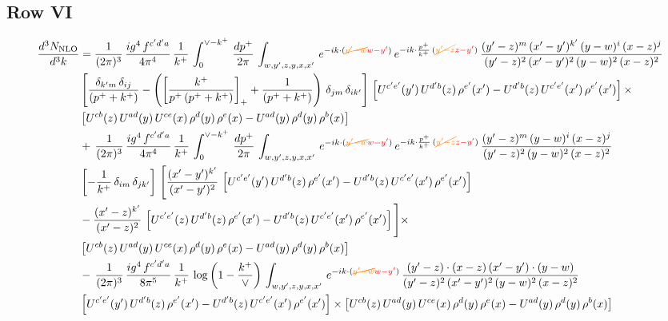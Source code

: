 \documentclass[9pt]{article}
\numberwithin{equation}{section}
\begin{document}
\subsection{Row VI}
\begin{align}
    \frac{d^{3}N_{\rm NLO}}{d^{3}k} & =  \frac{1}{(2\pi)^{3}}\, \frac{ig^{4}\,f^{c'd'a}}{4\pi^{4}}\, \frac{1}{k^{+}}\,\int_{0}^{\vee-k^{+}}\, \frac{dp^{+}}{2\pi}\, \int_{w,y',z,y,x,x'}\, e^{-ik\cdot ({\color{orange}\cancel{y'-w}}{\color{red}w-y'})}\, e^{-ik\cdot \frac{p^{+}}{k^{+}}\,({\color{orange}\cancel{y'-z}}{\color{red}z-y'})}\,\frac{(y'-z)^{m}\,(x'-y')^{k'}\,(y-w)^{i}\,(x-z)^{j}}{(y'-z)^{2}\,(x'-y')^{2}\,(y-w)^{2}\,(x-z)^{2}}\notag \\ & \left[\frac{\delta_{k'm}\,\delta_{ij}}{(p^{+}+k^{+})}-\left(\left[\frac{k^{+}}{p^{+}\,(p^{+}+k^{+})}\right]_{+}+\frac{1}{(p^{+}+k^{+})}\right)\,\delta_{jm}\,\delta_{ik'}\right]\, \left[U^{c'e'}(y')\,U^{d'b}(z)\,\rho^{e'}(x')-U^{d'b}(z)\,U^{c'e'}(x')\,\rho^{e'}(x')\right]\times\notag \\ &  \left[U^{cb}(z)\,U^{ad}(y)\,U^{ce}(x)\,\rho^{d}(y)\,\rho^{e}(x)-U^{ad}(y)\,\rho^{d}(y)\,\rho^{b}(x)\right] \notag \\ &  +\,\frac{1}{(2\pi)^{3}}\, \frac{ig^{4}\,f^{c'd'a}}{4\pi^{4}}\, \frac{1}{k^{+}}\,\int_{0}^{\vee-k^{+}}\, \frac{dp^{+}}{2\pi}\, \int_{w,y',z,y,x,x'}\, e^{-ik\cdot ({\color{orange}\cancel{y'-w}}{\color{red}w-y'})}\, e^{-ik\cdot \frac{p^{+}}{k^{+}}\,({\color{orange}\cancel{y'-z}}{\color{red}z-y'})}\,\frac{(y'-z)^{m}\,(y-w)^{i}\,(x-z)^{j}}{(y'-z)^{2}\,(y-w)^{2}\,(x-z)^{2}}\notag \\ &  \left[-\frac{1}{k^{+}}\, \delta_{im}\, \delta_{jk'}\right]\, \Bigg[\frac{(x'-y')^{k'}}{(x'-y')^{2}}\,\left[U^{c'e'}(y')\,U^{d'b}(z)\,\rho^{e'}(x')-U^{d'b}(z)\,U^{c'e'}(x')\,\rho^{e'}(x')\right]\notag \\ & -\frac{(x'-z)^{k'}}{(x'-z)^{2}}\,\left[U^{c'e'}(z)\,U^{d'b}(z)\,\rho^{e'}(x')-U^{d'b}(z)\,U^{c'e'}(x')\,\rho^{e'}(x')\right]\Bigg]\times\notag \\ &    \left[U^{cb}(z)\,U^{ad}(y)\,U^{ce}(x)\,\rho^{d}(y)\,\rho^{e}(x)-U^{ad}(y)\,\rho^{d}(y)\,\rho^{b}(x)\right] \notag \\
&  -\,\frac{1}{(2\pi)^{3}}\, \frac{ig^{4}\,f^{c'd'a}}{8\pi^{5}}\, \frac{1}{k^{+}}\,\log{\left(1-\frac{k^{+}}{\vee}\right)}\, \int_{w,y',z,y,x,x'}\, e^{-ik\cdot ({\color{orange}\cancel{y'-w}}{\color{red}w-y'})}\,\frac{(y'-z)\cdot (x-z)\,(x'-y')\cdot (y-w)}{(y'-z)^{2}\,(x'-y')^{2}\,(y-w)^{2}\,(x-z)^{2}}\notag \\ & \left[U^{c'e'}(y')\,U^{d'b}(z)\,\rho^{e'}(x')-U^{d'b}(z)\,U^{c'e'}(x')\,\rho^{e'}(x')\right]\times  \left[U^{cb}(z)\,U^{ad}(y)\,U^{ce}(x)\,\rho^{d}(y)\,\rho^{e}(x)-U^{ad}(y)\,\rho^{d}(y)\,\rho^{b}(x)\right]

\end{align}
\end{document}
